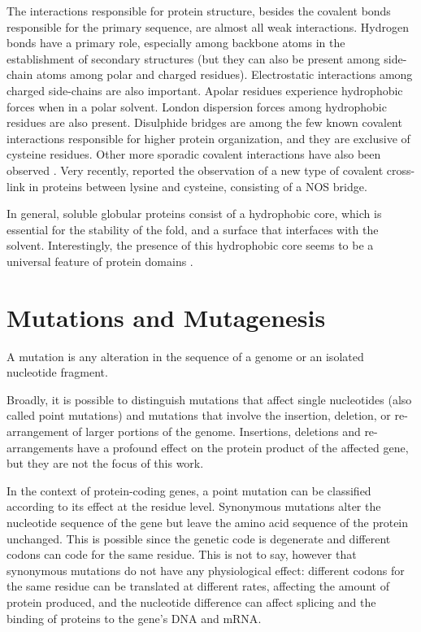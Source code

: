 The interactions responsible for protein structure, besides the covalent bonds responsible for the primary sequence, are almost all weak interactions.
Hydrogen bonds have a primary role, especially among backbone atoms in the establishment of secondary structures (but they can also be present among side-chain atoms among polar and charged residues).
Electrostatic interactions among charged side-chains are also important.
Apolar residues experience hydrophobic forces when in a polar solvent.
London dispersion forces among hydrophobic residues are also present.
Disulphide bridges are among the few known covalent interactions responsible for higher protein organization, and they are exclusive of cysteine residues.
Other more sporadic covalent interactions have also been observed \parencite[][for example]{Ito1991}.
Very recently, \textcite{Wensien2021} reported the observation of a new type of covalent cross-link in proteins between lysine and cysteine, consisting of a NOS bridge.

In general, soluble globular proteins consist of a hydrophobic core, which is essential for the stability of the fold, and a surface that interfaces with the solvent.
Interestingly, the presence of this hydrophobic core seems to be a universal feature of protein domains \parencite{Kalinowska2017}.

\section{Mutations and Mutagenesis}
A mutation is any alteration in the sequence of a genome or an isolated nucleotide fragment.

Broadly, it is possible to distinguish mutations that affect single nucleotides (also called point mutations) and mutations that involve the insertion, deletion, or re-arrangement of larger portions of the genome.
Insertions, deletions and re-arrangements have a profound effect on the protein product of the affected gene, but they are not the focus of this work.

In the context of protein-coding genes, a point mutation can be classified according to its effect at the residue level.
Synonymous mutations alter the nucleotide sequence of the gene but leave the amino acid sequence of the protein unchanged.
This is possible since the genetic code is degenerate and different codons can code for the same residue.
This is not to say, however that synonymous mutations do not have any physiological effect: different codons for the same residue can be translated at different rates, affecting the amount of protein produced, and the nucleotide difference can affect splicing and the binding of proteins to the gene's DNA and mRNA\@ \parencite{Hunt2014}.

